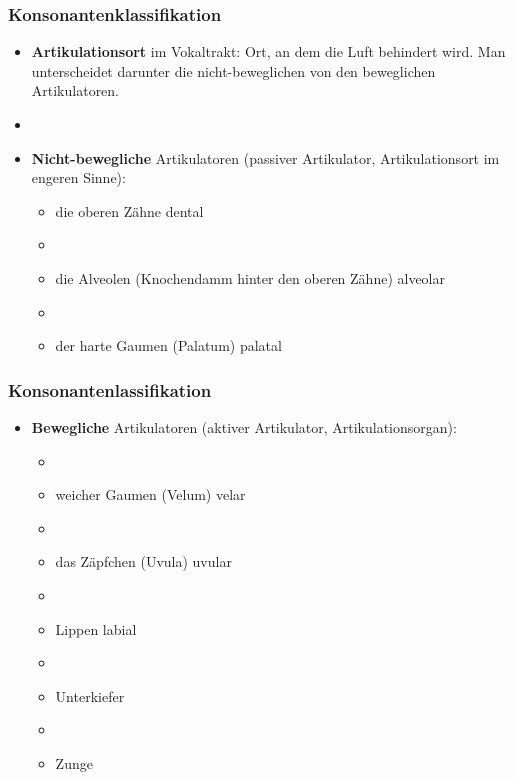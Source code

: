 \begin{frame}
\frametitle{Konsonantenklassifikation}

	\begin{itemize}
		\item \textbf{Artikulationsort} im Vokaltrakt: Ort, an dem die Luft behindert wird. Man unterscheidet darunter die nicht-beweglichen von den beweglichen Artikulatoren.

		\item[]
		\item \textbf{Nicht-bewegliche} Artikulatoren (passiver Artikulator, Artikulationsort im engeren Sinne):
			
		\begin{itemize}
			\item die oberen Zähne \ras dental
			\item[]
			\item die Alveolen (Knochendamm hinter den oberen Zähne) \ras alveolar
			\item[]
			\item der harte Gaumen (Palatum) \ras palatal
		\end{itemize}
		
	\end{itemize}
	
\end{frame}



\begin{frame}
\frametitle{Konsonantenlassifikation}

\begin{itemize}
	\item \textbf{Bewegliche} Artikulatoren (aktiver Artikulator, Artikulationsorgan):
			
	\begin{itemize}
		\item[]
		\item weicher Gaumen (Velum) \ras velar
		\item[]
		\item das Zäpfchen (Uvula) \ras uvular
		\item[]
		\item Lippen \ras labial
		\item[]
		\item Unterkiefer
		\item[]
		\item Zunge
	\end{itemize}

\end{itemize}

\end{frame}


